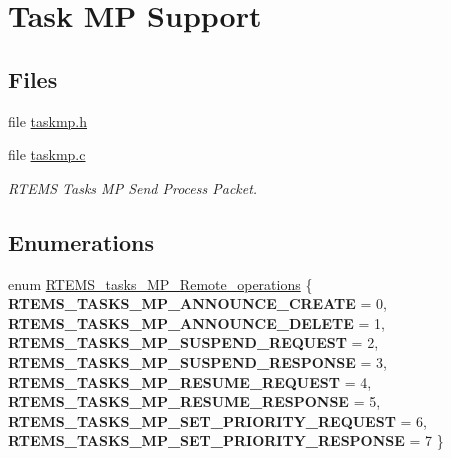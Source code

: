 \hypertarget{group__ClassicTaskMP}{}\section{Task MP Support}
\label{group__ClassicTaskMP}
\subsection*{Files}
\begin{DoxyCompactItemize}
\item 
file \mbox{\hyperlink{taskmp_8h}{taskmp.\+h}}
\item 
file \mbox{\hyperlink{taskmp_8c}{taskmp.\+c}}
\begin{DoxyCompactList}\small\item\em R\+T\+E\+MS Tasks MP Send Process Packet. \end{DoxyCompactList}\end{DoxyCompactItemize}
\subsection*{Enumerations}
\begin{DoxyCompactItemize}
\item 
enum \mbox{\hyperlink{group__ClassicTaskMP_ga8898253dbfcff93eb97b8646eefd1fa3}{R\+T\+E\+M\+S\+\_\+tasks\+\_\+\+M\+P\+\_\+\+Remote\+\_\+operations}} \{ \newline
{\bfseries R\+T\+E\+M\+S\+\_\+\+T\+A\+S\+K\+S\+\_\+\+M\+P\+\_\+\+A\+N\+N\+O\+U\+N\+C\+E\+\_\+\+C\+R\+E\+A\+TE} = 0, 
{\bfseries R\+T\+E\+M\+S\+\_\+\+T\+A\+S\+K\+S\+\_\+\+M\+P\+\_\+\+A\+N\+N\+O\+U\+N\+C\+E\+\_\+\+D\+E\+L\+E\+TE} = 1, 
{\bfseries R\+T\+E\+M\+S\+\_\+\+T\+A\+S\+K\+S\+\_\+\+M\+P\+\_\+\+S\+U\+S\+P\+E\+N\+D\+\_\+\+R\+E\+Q\+U\+E\+ST} = 2, 
{\bfseries R\+T\+E\+M\+S\+\_\+\+T\+A\+S\+K\+S\+\_\+\+M\+P\+\_\+\+S\+U\+S\+P\+E\+N\+D\+\_\+\+R\+E\+S\+P\+O\+N\+SE} = 3, 
\newline
{\bfseries R\+T\+E\+M\+S\+\_\+\+T\+A\+S\+K\+S\+\_\+\+M\+P\+\_\+\+R\+E\+S\+U\+M\+E\+\_\+\+R\+E\+Q\+U\+E\+ST} = 4, 
{\bfseries R\+T\+E\+M\+S\+\_\+\+T\+A\+S\+K\+S\+\_\+\+M\+P\+\_\+\+R\+E\+S\+U\+M\+E\+\_\+\+R\+E\+S\+P\+O\+N\+SE} = 5, 
{\bfseries R\+T\+E\+M\+S\+\_\+\+T\+A\+S\+K\+S\+\_\+\+M\+P\+\_\+\+S\+E\+T\+\_\+\+P\+R\+I\+O\+R\+I\+T\+Y\+\_\+\+R\+E\+Q\+U\+E\+ST} = 6, 
{\bfseries R\+T\+E\+M\+S\+\_\+\+T\+A\+S\+K\+S\+\_\+\+M\+P\+\_\+\+S\+E\+T\+\_\+\+P\+R\+I\+O\+R\+I\+T\+Y\+\_\+\+R\+E\+S\+P\+O\+N\+SE} = 7
 \}
\end{DoxyCompactItemize}
